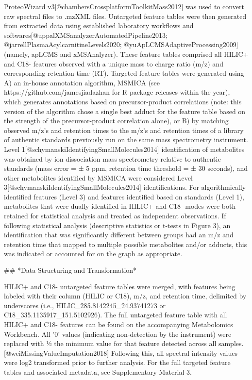 ProteoWizard v3[@chambersCrossplatformToolkitMass2012] was used to convert raw spectral files to .mzXML files. Untargeted feature tables were then generated from extracted data using established laboratory workflows and softwares[@uppalXMSanalyzerAutomatedPipeline2013; @jarrellPlasmaAcylcarnitineLevels2020; @yuApLCMSAdaptiveProcessing2009] (namely, apLCMS and xMSAnalyzer). These feature tables comprised all HILIC+ and C18- features observed with a unique mass to charge ratio (m/z) and corresponding retention time (RT). Targeted feature tables were generated using A) an in-house annotation algorithm, MSMICA (see https://github.com/jamesjiadazhan for R package releases within the year), which generates annotations based on precursor-product correlations (note: this version of the algorithm chose a single best adduct for the feature table based on the strength of the precursor-product correlation alone), or B) by matching observed m/z's and retention times to the m/z's and retention times of a library of authentic standards previously run on the same mass spectrometry instrument. Level 1[@schymanskiIdentifyingSmallMolecules2014] identification of metabolites was obtained by ion dissociation mass spectrometry relative to authentic standards (mass error = ± 5 ppm, retention time threshold = ± 30 seconds), and other metabolites identified by MSMICA were considered Level 3[@schymanskiIdentifyingSmallMolecules2014] identifications. For algorithmically identified features (Level 3) and features identified based on standards (Level 1), metabolites that were dually identified in HILIC+ and C18- modes were both retained for statistical analysis and treated as independent observations. If following statistical analysis (descriptive statistics or t-tests in Figure 3), an identification that was significantly different between groups had an m/z and retention time that mapped to multiple possible metabolites and/or adducts, this was indicated or accounted for on the graph as appropriate.

## *Data Structuring and Transformation*

HILIC+ and C18- untargeted feature tables were merged, with features being labeled with their column (HILIC or C18), m/z, and retention time, delimited by underscores (i.e., HILIC\_285.8142245\_24.93741273 or C18\_335.1135917\_151.5102926). The full untargeted feature table with all HILIC+ and C18- features can be found on the accompanying Metabolomics Workbench. All '0' values (indicating non-detection by the instrument) were replaced with ½ the minimum value for that feature detected across all samples.[@weiMissingValueImputation2018] Following this, all spectral intensity values were log2 transformed prior to further analysis. For the full targeted feature tables and associated metadata, see Supplementary Material 3.

